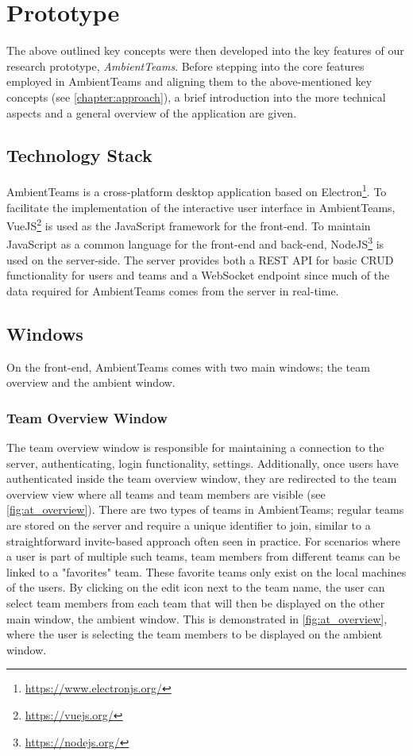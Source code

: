 \chapter{Prototype}
\label{chapter:prototype}
The above outlined key concepts were then developed into the key features of our research prototype, \textit{AmbientTeams}. Before stepping into the core features employed in AmbientTeams and aligning them to the above-mentioned key concepts (see \autoref{chapter:approach}), a brief introduction into the more technical aspects and a general overview of the application are given.

\section{Technology Stack}
AmbientTeams is a cross-platform desktop application based on Electron\footnote{\url{https://www.electronjs.org/}}. To facilitate the implementation of the interactive user interface in AmbientTeams, VueJS\footnote{\url{https://vuejs.org/}} is used as the JavaScript framework for the front-end. To maintain JavaScript as a common language for the front-end and back-end, NodeJS\footnote{\url{https://nodejs.org/}} is used on the server-side. The server provides both a REST API for basic CRUD functionality for users and teams and a WebSocket endpoint since much of the data required for AmbientTeams comes from the server in real-time.

\section{Windows}
On the front-end, AmbientTeams comes with two main windows; the team overview and the ambient window.

\subsection{Team Overview Window}
The team overview window is responsible for maintaining a connection to the server, authenticating, login functionality, settings. Additionally, once users have authenticated inside the team overview window, they are redirected to the team overview view where all teams and team members are visible (see \autoref{fig:at_overview}). There are two types of teams in AmbientTeams; regular teams are stored on the server and require a unique identifier to join, similar to a straightforward invite-based approach often seen in practice. For scenarios where a user is part of multiple such teams, team members from different teams can be linked to a "favorites" team. These favorite teams only exist on the local machines of the users. By clicking on the edit icon next to the team name, the user can select team members from each team that will then be displayed on the other main window, the ambient window. This is demonstrated in \autoref{fig:at_overview}, where the user is selecting the team members to be displayed on the ambient window.

